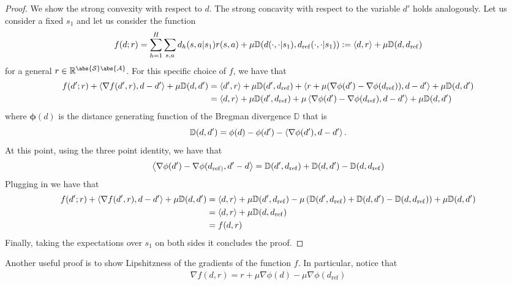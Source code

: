 \begin{proof}
We show the strong convexity with respect to $d$. The strong concavity with respect to the variable $d'$ holds analogously.
Let us consider a fixed $s_1$ and let us consider the function
$$
f(d; r) = \sum^H_{h=1}\sum_{s,a} d_h(s,a|s_1) r(s,a) + \mu \mathbb{D}(d(\cdot,\cdot|s_1),d_{\mathrm{ref}}(\cdot,\cdot|s_1)) 
:= \left\langle{d},{r}\right\rangle + \mu \mathbb{D}(d,d_{\mathrm{ref}})
$$
for a general $r \in \mathbb{R}^{\abs{\mathcal{S}}\abs{\mathcal{A}}}$.
For this specific choice of $f$, we have that
\begin{align*}
f(d';r) + \left\langle{\nabla f (d',r)},{d - d'}\right\rangle + \mu \mathbb{D}(d,d') &= \left\langle{d'},{r}\right\rangle + \mu \mathbb{D}(d',d_{\mathrm{ref}}) + \left\langle{r +\mu (\nabla \phi(d') - \nabla \phi(d_{\mathrm{ref}}))},{d - d'}\right\rangle + \mu \mathbb{D}(d,d') \\
&= \left\langle{d},{r}\right\rangle + \mu \mathbb{D}(d',d_{\mathrm{ref}}) + \mu \left\langle{ \nabla \phi(d') - \nabla \phi(d_{\mathrm{ref}})},{d - d'}\right\rangle + \mu \mathbb{D}(d,d') \\
\end{align*}
where $\mathbf{\phi}(d)$ is the distance generating function of the Bregman divergence $\mathbb{D}$ that is
\begin{equation*}
    \mathbb{D}(d,d') = \mathbf{\phi}(d) - \mathbf{\phi}(d') - \left\langle{\nabla \phi(d')},{d - d'}\right\rangle.
\end{equation*}
At this point, using the three point identity, we have that
\begin{equation*}
\left\langle{\nabla \phi(d') - \nabla\phi(d_{\mathrm{ref})}},{d' - d}\right\rangle = \mathbb{D}(d',d_{\mathrm{ref}}) + \mathbb{D}(d,d') - \mathbb{D}(d,d_{\mathrm{ref}})
\end{equation*}
Plugging in we have that
\begin{align*}
f(d';r) + \left\langle{\nabla f (d',r)},{d - d'}\right\rangle + \mu \mathbb{D}(d,d') &= \left\langle{d},{r}\right\rangle + \mu \mathbb{D}(d',d_{\mathrm{ref}}) - \mu \left({\mathbb{D}(d',d_{\mathrm{ref}}) + \mathbb{D}(d,d') - \mathbb{D}(d, d_{\mathrm{ref}})}\right) + \mu \mathbb{D}(d,d') \\
&= \left\langle{d},{r}\right\rangle  + \mu \mathbb{D}(d,d_{\mathrm{ref}}) \\&= f(d,r) 
\end{align*}
Finally, taking the expectations over $s_1$ on both sides it concludes the proof.
\end{proof}
Another useful proof is to show Lipshitzness of the gradients of the function $f$.
In particular, notice that
\begin{align*}
\nabla f(d,r) = r + \mu \nabla \phi(d) - \mu \nabla \phi(d_{\mathrm{ref}})
\end{align*}
